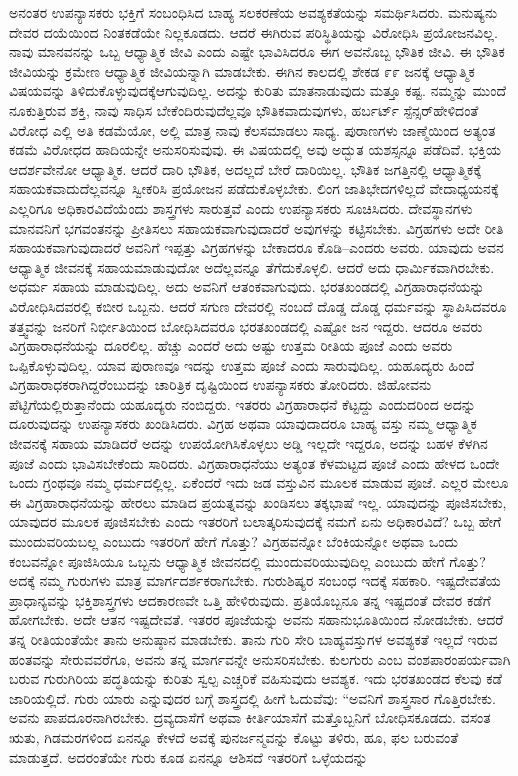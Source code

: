 ಅನಂತರ ಉಪನ್ಯಾಸಕರು ಭಕ್ತಿಗೆ ಸಂಬಂಧಿಸಿದ ಬಾಹ್ಯ ಸಲಕರಣೆಯ ಅವಶ್ಯಕತೆಯನ್ನು ಸಮರ್ಥಿಸಿದರು. ಮನುಷ್ಯನು ದೇವರ ದಯೆಯಿಂದ ನಿಂತಕಡೆಯೇ ನಿಲ್ಲಕೂಡದು. ಆದರೆ ಈಗಿರುವ ಪರಿಸ್ಥಿತಿಯನ್ನು ವಿರೋಧಿಸಿ ಪ್ರಯೋಜನವಿಲ್ಲ. ನಾವು ಮಾನವನನ್ನು ಒಬ್ಬ ಆಧ್ಯಾತ್ಮಿಕ ಜೀವಿ ಎಂದು ಎಷ್ಟೇ ಭಾವಿಸಿದರೂ ಈಗ ಅವನೊಬ್ಬ ಭೌತಿಕ ಜೀವಿ. ಈ ಭೌತಿಕ ಜೀವಿಯನ್ನು ಕ್ರಮೇಣ ಆಧ್ಯಾತ್ಮಿಕ ಜೀವಿಯನ್ನಾಗಿ ಮಾಡಬೇಕು. ಈಗಿನ ಕಾಲದಲ್ಲಿ ಶೇಕಡ ೯೯ ಜನಕ್ಕೆ ಆಧ್ಯಾತ್ಮಿಕ ವಿಷಯವನ್ನು ತಿಳಿದುಕೊಳ್ಳುವುದಕ್ಕೆ\break ಆಗುವುದಿಲ್ಲ. ಅದನ್ನು ಕುರಿತು ಮಾತನಾಡುವುದು ಮತ್ತೂ ಕಷ್ಟ. ನಮ್ಮನ್ನು ಮುಂದೆ ನೂಕುತ್ತಿರುವ ಶಕ್ತಿ, ನಾವು ಸಾಧಿಸ ಬೇಕೆಂದಿರುವುದೆಲ್ಲವೂ ಭೌತಿಕವಾದುವುಗಳು, ಹರ್ಬರ್ಟ್​ ಸ್ಪೆನ್ಸರ್​ ಹೇಳಿದಂತೆ ವಿರೋಧ ಎಲ್ಲಿ ಅತಿ ಕಡಮೆಯೋ, ಅಲ್ಲಿ ಮಾತ್ರ ನಾವು ಕೆಲಸಮಾಡಲು ಸಾಧ್ಯ. ಪುರಾಣಗಳು ಜಾಣ್ಮೆಯಿಂದ ಅತ್ಯಂತ ಕಡಮೆ ವಿರೋಧದ ಹಾದಿಯನ್ನೇ ಅನುಸರಿಸುವುವು. ಈ ವಿಷಯದಲ್ಲಿ ಅವು ಅದ್ಭುತ ಯಶಸ್ಸನ್ನೂ ಪಡೆದಿವೆ. ಭಕ್ತಿಯ ಆದರ್ಶವೇನೋ ಆಧ್ಯಾತ್ಮಿಕ. ಆದರೆ ದಾರಿ ಭೌತಿಕ, ಅದಲ್ಲದೆ ಬೇರೆ ದಾರಿಯಿಲ್ಲ. ಭೌತಿಕ ಜಗತ್ತಿನಲ್ಲಿ ಆಧ್ಯಾತ್ಮಿಕಕ್ಕೆ ಸಹಾಯಕವಾದುದೆಲ್ಲವನ್ನೂ ಸ್ವೀಕರಿಸಿ ಪ್ರಯೋಜನ ಪಡೆದುಕೊಳ್ಳಬೇಕು. ಲಿಂಗ ಜಾತಿಭೇದಗಳಿಲ್ಲದೆ ವೇದಾಧ್ಯಯನಕ್ಕೆ ಎಲ್ಲರಿಗೂ ಅಧಿಕಾರವಿದೆಯೆಂದು ಶಾಸ್ತ್ರಗಳು ಸಾರುತ್ತವೆ ಎಂದು ಉಪನ್ಯಾಸಕರು ಸೂಚಿಸಿದರು. ದೇವಸ್ಥಾನಗಳು ಮಾನವನಿಗೆ ಭಗವಂತನನ್ನು ಪ್ರೀತಿಸಲು ಸಹಾಯಕವಾಗುವುದಾದರೆ ಅವುಗಳನ್ನು ಕಟ್ಟಿಸಬೇಕು. ವಿಗ್ರಹಗಳು ಅದೇ ರೀತಿ ಸಹಾಯಕವಾಗುವುದಾದರೆ ಅವನಿಗೆ ಇಪ್ಪತ್ತು ವಿಗ್ರಹಗಳನ್ನು ಬೇಕಾದರೂ ಕೊಡಿ–ಎಂದರು ಅವರು. ಯಾವುದು ಅವನ ಆಧ್ಯಾತ್ಮಿಕ ಜೀವನಕ್ಕೆ ಸಹಾಯಮಾಡುವುದೋ ಅದೆಲ್ಲವನ್ನೂ ತೆಗೆದುಕೊಳ್ಳಲಿ. ಆದರೆ ಅದು ಧಾರ್ಮಿಕವಾಗಿರಬೇಕು. ಅಧರ್ಮ ಸಹಾಯ ಮಾಡುವುದಿಲ್ಲ. ಅದು ಅವನಿಗೆ ಆತಂಕವಾಗುವುದು. ಭರತಖಂಡದಲ್ಲಿ ವಿಗ್ರಹಾರಾಧನೆಯನ್ನು ವಿರೋಧಿಸಿದವರಲ್ಲಿ ಕಬೀರ ಒಬ್ಬನು. ಆದರೆ ಸಗುಣ ದೇವರಲ್ಲಿ ನಂಬದೆ ದೊಡ್ಡ ದೊಡ್ಡ ಧರ್ಮವನ್ನು ಸ್ಥಾಪಿಸಿದವರೂ ತತ್ತ್ವವನ್ನು ಜನರಿಗೆ ನಿರ್ಭೀತಿಯಿಂದ ಬೋಧಿಸಿದವರೂ ಭರತಖಂಡದಲ್ಲಿ ಎಷ್ಟೋ ಜನ ಇದ್ದರು. ಆದರೂ ಅವರು ವಿಗ್ರಹಾರಾಧನೆಯನ್ನು ದೂರಲಿಲ್ಲ. ಹೆಚ್ಚು ಎಂದರೆ ಅದು ಅಷ್ಟು ಉತ್ತಮ ರೀತಿಯ ಪೂಜೆ ಎಂದು ಅವರು ಒಪ್ಪಿಕೊಳ್ಳುವುದಿಲ್ಲ. ಯಾವ ಪುರಾಣವೂ ಇದನ್ನು ಉತ್ತಮ ಪೂಜೆ ಎಂದು ಸಾರುವುದಿಲ್ಲ. ಯಹೂದ್ಯರು ಹಿಂದೆ ವಿಗ್ರಹಾರಾಧಕರಾಗಿದ್ದರೆಂಬುದನ್ನು ಚಾರಿತ್ರಿಕ ದೃಷ್ಟಿಯಿಂದ ಉಪನ್ಯಾಸಕರು ತೋರಿದರು. ಜಿಹೋವನು ಪೆಟ್ಟಿಗೆಯಲ್ಲಿರುತ್ತಾನೆಂದು ಯಹೂದ್ಯರು ನಂಬಿದ್ದರು. ಇತರರು ವಿಗ್ರಹಾರಾಧನೆ ಕೆಟ್ಟದ್ದು ಎಂದುದರಿಂದ ಅದನ್ನು ದೂರುವುದನ್ನು ಉಪನ್ಯಾಸಕರು ಖಂಡಿಸಿದರು. ವಿಗ್ರಹ ಅಥವಾ ಯಾವುದಾದರೂ ಬಾಹ್ಯ ವಸ್ತು ನಮ್ಮ ಆಧ್ಯಾತ್ಮಿಕ ಜೀವನಕ್ಕೆ ಸಹಾಯ ಮಾಡಿದರೆ ಅದನ್ನು ಉಪಯೋಗಿಸಿಕೊಳ್ಳಲು ಅಡ್ಡಿ ಇಲ್ಲದೇ ಇದ್ದರೂ, ಅದನ್ನು ಬಹಳ ಕೆಳಗಿನ ಪೂಜೆ ಎಂದು ಭಾವಿಸಬೇಕೆಂದು ಸಾರಿದರು. ವಿಗ್ರಹಾರಾಧನೆಯು ಅತ್ಯಂತ ಕೆಳಮಟ್ಟದ ಪೂಜೆ ಎಂದು ಹೇಳದ ಒಂದೇ ಒಂದು ಗ್ರಂಥವೂ ನಮ್ಮ ಧರ್ಮದಲ್ಲಿಲ್ಲ. ಏಕೆಂದರೆ ಇದು ಜಡ ವಸ್ತುವಿನ ಮೂಲಕ ಮಾಡುವ ಪೂಜೆ. ಎಲ್ಲರ ಮೇಲೂ ಈ ವಿಗ್ರಹಾರಾಧನೆಯನ್ನು ಹೇರಲು ಮಾಡಿದ ಪ್ರಯತ್ನವನ್ನು ಖಂಡಿಸಲು ತಕ್ಕಭಾಷೆ ಇಲ್ಲ. ಯಾವುದನ್ನು ಪೂಜಿಸಬೇಕು, ಯಾವುದರ ಮೂಲಕ ಪೂಜಿಸಬೇಕು ಎಂದು ಇತರರಿಗೆ ಬಲಾತ್ಕರಿಸುವುದಕ್ಕೆ ನಮಗೆ ಏನು ಅಧಿಕಾರವಿದೆ? ಒಬ್ಬ ಹೇಗೆ ಮುಂದುವರಿಯಬಲ್ಲ ಎಂಬುದು ಇತರರಿಗೆ ಹೇಗೆ ಗೊತ್ತು? ವಿಗ್ರಹವನ್ನೋ ಬೆಂಕಿಯನ್ನೋ ಅಥವಾ ಒಂದು ಕಂಬವನ್ನೋ ಪೂಜಿಸಿಯೂ ಒಬ್ಬನು ಆಧ್ಯಾತ್ಮಿಕ ಜೀವನದಲ್ಲಿ ಮುಂದುವರಿಯುವುದಿಲ್ಲ ಎಂಬುದು ಹೇಗೆ ಗೊತ್ತು? ಅದಕ್ಕೆ ನಮ್ಮ ಗುರುಗಳು ಮಾತ್ರ ಮಾರ್ಗದರ್ಶಕರಾಗಬೇಕು. ಗುರುಶಿಷ್ಯರ ಸಂಬಂಧ ಇದಕ್ಕೆ ಸಹಕಾರಿ. ಇಷ್ಟದೇವತೆಯ ಪ್ರಾಧಾನ್ಯವನ್ನು ಭಕ್ತಿಶಾಸ್ತ್ರಗಳು ಆದಕಾರಣವೇ ಒತ್ತಿ ಹೇಳಿರುವುದು. ಪ್ರತಿಯೊಬ್ಬನೂ ತನ್ನ ಇಷ್ಟದಂತೆ ದೇವರ ಕಡೆಗೆ ಹೋಗಬೇಕು. ಅದೇ ಆತನ ಇಷ್ಟದೇವತೆ. ಇತರರ ಪೂಜೆಯನ್ನು ಅವನು ಸಹಾನುಭೂತಿಯಿಂದ ನೋಡಬೇಕು. ಆದರೆ ತನ್ನ ರೀತಿಯಂತೆಯೇ ತಾನು ಅನುಷ್ಠಾನ ಮಾಡಬೇಕು. ತಾನು ಗುರಿ ಸೇರಿ ಬಾಹ್ಯವಸ್ತುಗಳ ಅವಶ್ಯಕತೆ ಇಲ್ಲದೆ ಇರುವ ಹಂತವನ್ನು ಸೇರುವವರೆಗೂ, ಅವನು ತನ್ನ ಮಾರ್ಗವನ್ನೇ ಅನುಸರಿಸಬೇಕು. ಕುಲಗುರು ಎಂಬ ವಂಶಪಾರಂಪರ್ಯವಾಗಿ ಬರುವ ಗುರುಗಿರಿಯ ಪದ್ಧತಿಯನ್ನು ಕುರಿತು ಸ್ವಲ್ಪ ಎಚ್ಚರಿಕೆ ವಹಿಸುವುದು ಆವಶ್ಯಕ. ಇದು ಭರತಖಂಡದ ಕೆಲವು ಕಡೆ ಜಾರಿಯಲ್ಲಿದೆ. ಗುರು ಯಾರು ಎನ್ನುವುದರ ಬಗ್ಗೆ ಶಾಸ್ತ್ರದಲ್ಲಿ ಹೀಗೆ ಓದುವೆವು: “ಅವನಿಗೆ ಶಾಸ್ತ್ರಸಾರ ಗೊತ್ತಿರಬೇಕು. ಅವನು ಪಾಪದೂರನಾಗಿರಬೇಕು. ದ್ರವ್ಯದಾಸೆಗೆ ಅಥವಾ ಕೀರ್ತಿಯಾಸೆಗೆ ಮತ್ತೊಬ್ಬನಿಗೆ ಬೋಧಿಸಕೂಡದು. ವಸಂತ ಋತು, ಗಿಡಮರಗಳಿಂದ ಏನನ್ನೂ ಕೇಳದೆ ಅವಕ್ಕೆ ಪುನರ್ಜನ್ಮವನ್ನು ಕೊಟ್ಟು ತಳಿರು, ಹೂ, ಫಲ ಬರುವಂತೆ ಮಾಡುತ್ತದೆ. ಅದರಂತೆಯೇ ಗುರು ಕೂಡ ಏನನ್ನೂ ಆಶಿಸದೆ ಇತರರಿಗೆ ಒಳ್ಳೆಯದನ್ನು 